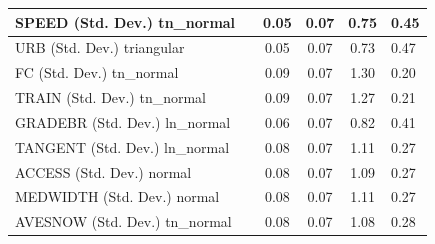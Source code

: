 \begin{table}
\begin{center}
\begin{tabular}{|l|l|c|c|c|l|}
			\hline
			SPEED (Std. Dev.) tn_normal &  & 0.05 & 0.07 & 0.75 & 0.45 \\
			\hline
			URB (Std. Dev.) triangular &  & 0.05 & 0.07 & 0.73 & 0.47 \\
			\hline
			FC (Std. Dev.) tn_normal &  & 0.09 & 0.07 & 1.30 & 0.20 \\
			\hline
			TRAIN (Std. Dev.) tn_normal &  & 0.09 & 0.07 & 1.27 & 0.21 \\
			\hline
			GRADEBR (Std. Dev.) ln_normal &  & 0.06 & 0.07 & 0.82 & 0.41 \\
			\hline
			TANGENT (Std. Dev.) ln_normal &  & 0.08 & 0.07 & 1.11 & 0.27 \\
			\hline
			ACCESS (Std. Dev.) normal &  & 0.08 & 0.07 & 1.09 & 0.27 \\
			\hline
			MEDWIDTH (Std. Dev.) normal &  & 0.08 & 0.07 & 1.11 & 0.27 \\
			\hline
			AVESNOW (Std. Dev.) tn_normal &  & 0.08 & 0.07 & 1.08 & 0.28 \\
			\hline
		\end{tabular}
	\end{center}
\end{table}